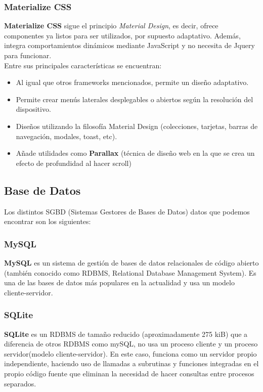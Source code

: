     \subsubsection{Materialize CSS}
    \textbf{Materialize CSS} \cite{materialize-css} sigue el principio \textit{Material Design},
    es decir, ofrece componentes ya listos para ser utilizados, por supuesto adaptativo.
    Además, integra comportamientos dinámicos mediante JavaScript y no necesita de Jquery para
    funcionar.\\

    Entre sus principales características se encuentran:
        
        \begin{itemize}
            \item Al igual que otros frameworks mencionados, permite un diseño adaptativo.
            \item Permite crear menús laterales desplegables o abiertos según la resolución
            del dispositivo.
            \item Diseños utilizando la filosofía Material Design (colecciones, tarjetas,
            barras de navegación, modales, toast, etc).
            \item Añade utilidades como \textbf{Parallax} (técnica de diseño web en la que se crea
            un efecto de profundidad al hacer scroll)
        \end{itemize}

\subsection{Base de Datos}
Los distintos SGBD (Sistemas Gestores de Bases de Datos) datos que podemos encontrar son los
siguientes:

    \subsubsection{MySQL}
    \textbf{MySQL} \cite{mysql} es un sistema de gestión de bases de datos relacionales de
    código abierto (también conocido como RDBMS, Relational Database Management System). Es
    una de las bases de datos más populares en la actualidad y usa un modelo
    cliente-servidor.
    

    \subsubsection{SQLite}
    \textbf{SQLite} \cite{sqlite} es un RDBMS de tamaño reducido (aproximadamente 275 kiB)
    que a diferencia de otros RDBMS como mySQL, no usa un proceso cliente y un proceso
    servidor(modelo cliente-servidor). En este caso, funciona como un servidor
    propio independiente, haciendo uso de llamadas a subrutinas y funciones integradas en el
    propio código fuente que eliminan la necesidad de hacer consultas entre procesos
    separados.

